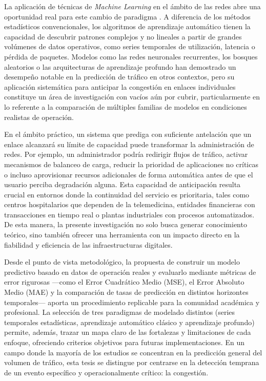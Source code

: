 \documentclass[12pt]{report}
\begin{document}
La aplicación de técnicas de \textit{Machine Learning} en el ámbito de las redes abre una oportunidad real para este cambio de paradigma \cite{boutaba2018}. A diferencia de los métodos estadísticos convencionales, los algoritmos de aprendizaje automático tienen la capacidad de descubrir patrones 
complejos y no lineales a partir de grandes volúmenes de datos operativos, como series temporales de utilización, latencia o pérdida de paquetes. Modelos como las redes neuronales recurrentes, los bosques aleatorios o las arquitecturas de aprendizaje profundo han demostrado un desempeño notable en la 
predicción de tráfico en otros contextos, pero su aplicación sistemática para anticipar la congestión en enlaces individuales constituye un área de investigación con vacíos aún por cubrir, particularmente en lo referente a la comparación de múltiples familias de modelos en condiciones realistas de operación.

En el ámbito práctico, un sistema que prediga con suficiente antelación que un enlace alcanzará su límite de capacidad puede transformar la administración de redes. Por ejemplo, un administrador podría redirigir flujos de tráfico, activar mecanismos de balanceo de carga, reducir la prioridad de 
aplicaciones no críticas o incluso aprovisionar recursos adicionales de forma automática antes de que el usuario perciba degradación alguna. Esta capacidad de anticipación resulta crucial en entornos donde la continuidad del servicio es prioritaria, tales como centros hospitalarios que dependen de la telemedicina, 
entidades financieras con transacciones en tiempo real o plantas industriales con procesos automatizados. De esta manera, la presente investigación no solo busca generar conocimiento teórico, sino también ofrecer una herramienta con un impacto directo en la fiabilidad y eficiencia de las infraestructuras digitales.

Desde el punto de vista metodológico, la propuesta de construir un modelo predictivo basado en datos de operación reales y evaluarlo mediante métricas de error rigurosas —como el Error Cuadrático Medio (MSE), el Error Absoluto Medio (MAE) y la comparación de tasas de predicción en distintos horizontes 
temporales— aporta un procedimiento replicable para la comunidad académica y profesional. La selección de tres paradigmas de modelado distintos (series temporales estadísticas, aprendizaje automático clásico y aprendizaje profundo) permite, además, trazar un mapa claro de las fortalezas y limitaciones de cada enfoque, 
ofreciendo criterios objetivos para futuras implementaciones. En un campo donde la mayoría de los estudios se concentran en la predicción general del volumen de tráfico, esta tesis se distingue por centrarse en la detección temprana de un evento específico y operacionalmente crítico: la congestión.
\end{document}
